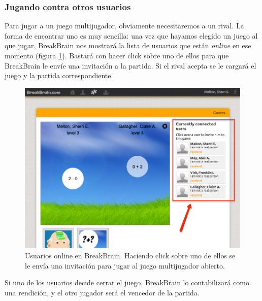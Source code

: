 \subsubsection{Jugando contra otros usuarios}

Para jugar a un juego multijugador, obviamente necesitaremos a un rival. La forma de encontrar uno es muy sencilla: una vez que hayamos elegido un juego al que jugar, BreakBrain nos mostrará la lista de usuarios que están {\it online} en ese momento (figura \ref{fig::online-users}). Bastará con hacer click sobre uno de ellos para que BreakBrain le envíe una invitación a la partida. Si el rival acepta se le cargará el juego y la partida correspondiente.

\begin{figure}[h]
  \begin{center}
    \includegraphics[width=\textwidth]{./images/online-users.png}
  \end{center}  
  \caption{Usuarios online en BreakBrain. Haciendo click sobre uno de ellos se le envía una invitación para jugar al juego multijugador abierto.}
  \label{fig::online-users}
\end{figure}

Si uno de los usuarios decide cerrar el juego, BreakBrain lo contabilizará como una rendición, y el otro jugador será el vencedor de la partida.
